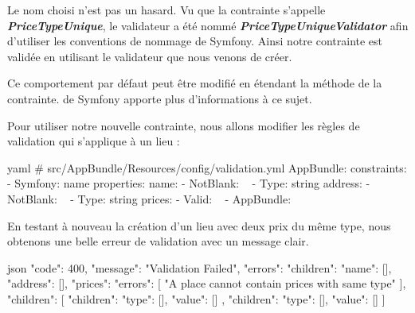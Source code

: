 \documentclass[big]{zmdocument}
\begin{document}
Le nom choisi n'est pas un hasard. Vu que la contrainte s'appelle \textbf{\textit{PriceTypeUnique}}, le validateur a été nommé  \textbf{\textit{PriceTypeUniqueValidator}} afin d'utiliser les conventions de nommage de Symfony. Ainsi notre contrainte est validée en utilisant le validateur que nous venons de créer.



\begin{Information}
Ce comportement par défaut peut être modifié en étendant la méthode  de la contrainte.  de Symfony apporte plus d'informations à ce sujet.
\end{Information}


Pour utiliser notre nouvelle contrainte, nous allons modifier les règles de validation qui s'applique à un lieu :



\begin{CodeBlock}{yaml}
# src/AppBundle/Resources/config/validation.yml
AppBundle\Entity\Place:
    constraints:
        - Symfony\Bridge\Doctrine\Validator\Constraints\UniqueEntity: name
    properties:
        name:
            - NotBlank: ~
            - Type: string
        address:
            - NotBlank: ~
            - Type: string
        prices:
            - Valid: ~
            - AppBundle\Form\Validator\Constraint\PriceTypeUnique: ~
\end{CodeBlock}



En testant à nouveau la création d'un lieu avec deux prix du même type, nous obtenons une belle erreur de validation avec un message clair.



\begin{CodeBlock}{json}
{
  "code": 400,
  "message": "Validation Failed",
  "errors": {
    "children": {
      "name": [],
      "address": [],
      "prices": {
        "errors": [
          "A place cannot contain prices with same type"
        ],
        "children": [
          {
            "children": {
              "type": [],
              "value": []
            }
          },
          {
            "children": {
              "type": [],
              "value": []
            }
          }
        ]
      }
    }
  }
}
\end{CodeBlock}
\end{document}
